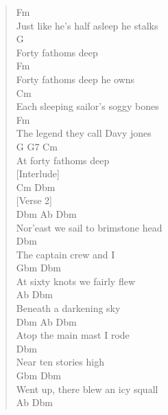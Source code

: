 \documentclass[11pt]{article}
\begin{document}
\begin{verse}
\hspace*{5em}Fm\\
Just like he's half asleep he stalks\\
G\\
Forty fathoms deep\\
Fm\\
Forty fathoms deep he owns\\
\hspace*{5em}Cm\\
Each sleeping sailor's soggy bones\\
\hspace*{4em}Fm\\
The legend they call Davy jones\\
\hspace*{3em}G     G7      Cm\\
At forty fathoms deep\\
\vspace*{1em}
\vspace*{1em}
[Interlude]\\
Cm   Dbm\\
\vspace*{1em}
\vspace*{1em}
[Verse 2]\\
\hspace*{4em}Dbm     Ab      Dbm\\
Nor'east we sail to brimstone head\\
\hspace*{4em}Dbm\\
The captain crew and I\\
\hspace*{3em}Gbm            Dbm\\
At sixty knots we fairly flew\\
\hspace*{3em}Ab               Dbm\\
Beneath a darkening sky\\
\vspace*{1em}
\hspace*{1em}Dbm     Ab   Dbm\\
Atop the main mast I rode\\
Dbm\\
Near ten stories high\\
\hspace*{5em}Gbm               Dbm\\
Went up, there blew an icy squall\\
\hspace*{4em}Ab              Dbm\\

\end{verse}
\end{document}
